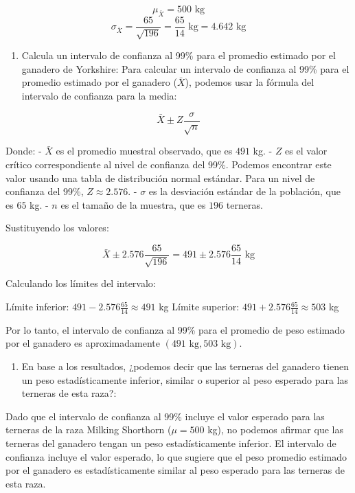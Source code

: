 \documentclass[
  letterpaper,
  DIV=11,
  numbers=noendperiod]{scrartcl}
\providecommand{\tightlist}{%
  \setlength{\itemsep}{0pt}\setlength{\parskip}{0pt}}\usepackage{longtable,booktabs,array}
\begin{document}
\[\mu_{\bar{X}} = 500 \text{ kg}\]
\[\sigma_{\bar{X}} = \frac{65}{\sqrt{196}} = \frac{65}{14} \text{ kg} = 4.642 \text{ kg}\]

\begin{enumerate}
\def\labelenumi{\roman{enumi}.}
\setcounter{enumi}{1}
\tightlist
\item
  Calcula un intervalo de confianza al 99\% para el promedio estimado
  por el ganadero de Yorkshire: Para calcular un intervalo de confianza
  al 99\% para el promedio estimado por el ganadero (\(\bar{X}\)),
  podemos usar la fórmula del intervalo de confianza para la media:
\end{enumerate}

\[\bar{X} \pm Z \frac{\sigma}{\sqrt{n}}\]

Donde: - \(\bar{X}\) es el promedio muestral observado, que es \(491\)
kg. - \(Z\) es el valor crítico correspondiente al nivel de confianza
del 99\%. Podemos encontrar este valor usando una tabla de distribución
normal estándar. Para un nivel de confianza del 99\%,
\(Z \approx 2.576\). - \(\sigma\) es la desviación estándar de la
población, que es \(65\) kg. - \(n\) es el tamaño de la muestra, que es
\(196\) terneras.

Sustituyendo los valores:

\[\bar{X} \pm 2.576 \frac{65}{\sqrt{196}} = 491 \pm 2.576 \frac{65}{14} \text{ kg}\]

Calculando los límites del intervalo:

Límite inferior: \(491 - 2.576 \frac{65}{14} \approx 491\) kg Límite
superior: \(491 + 2.576 \frac{65}{14} \approx 503\) kg

Por lo tanto, el intervalo de confianza al 99\% para el promedio de peso
estimado por el ganadero es aproximadamente
\((491 \text{ kg}, 503 \text{ kg})\).

\begin{enumerate}
\def\labelenumi{\roman{enumi}.}
\setcounter{enumi}{2}
\tightlist
\item
  En base a los resultados, ¿podemos decir que las terneras del ganadero
  tienen un peso estadísticamente inferior, similar o superior al peso
  esperado para las terneras de esta raza?:
\end{enumerate}

Dado que el intervalo de confianza al 99\% incluye el valor esperado
para las terneras de la raza Milking Shorthorn (\(\mu = 500\) kg), no
podemos afirmar que las terneras del ganadero tengan un peso
estadísticamente inferior. El intervalo de confianza incluye el valor
esperado, lo que sugiere que el peso promedio estimado por el ganadero
es estadísticamente similar al peso esperado para las terneras de esta
raza.
\end{document}

